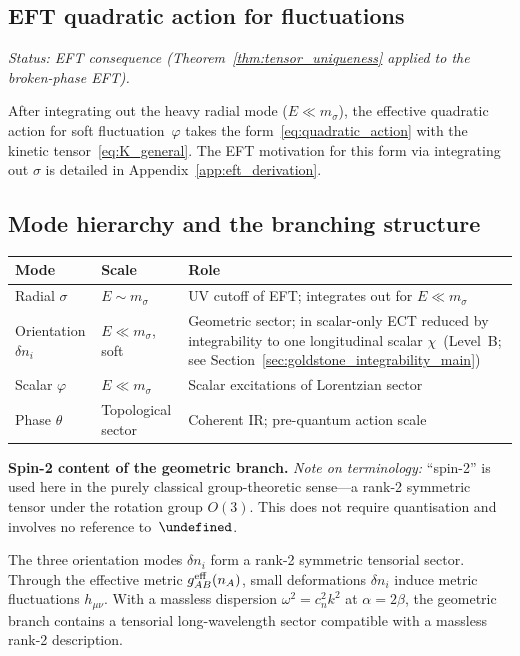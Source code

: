 \documentclass[11pt,a4paper]{article}
\let\hbar\undefined
\numberwithin{equation}{section}
\begin{document}
\subsection{EFT quadratic action for fluctuations}

\label{sec:eft_quadratic}

\textit{Status: EFT consequence (Theorem~\ref{thm:tensor_uniqueness}
applied to the broken-phase EFT).}

After integrating out the heavy radial mode ($E\ll m_\sigma$),
the effective quadratic action for soft fluctuation~$\varphi$
takes the form~\eqref{eq:quadratic_action} with the kinetic
tensor~\eqref{eq:K_general}. The EFT motivation for this form
via integrating out $\sigma$ is detailed in
Appendix~\ref{app:eft_derivation}.

\subsection{Mode hierarchy and the branching structure}
\label{sec:mode_hierarchy}

\begin{center}
\renewcommand{\arraystretch}{1.4}
\begin{tabular}{p{3cm}p{3.5cm}p{5cm}}
\hline\hline
Mode & Scale & Role \\
\hline
Radial $\sigma$ & $E\sim m_\sigma$ & UV cutoff of EFT; integrates out for $E\ll m_\sigma$ \\
Orientation $\delta n_i$ & $E\ll m_\sigma$, soft & Geometric sector; in scalar-only ECT reduced by
integrability to one longitudinal scalar $\chi$~(Level~B; see
Section~\ref{sec:goldstone_integrability_main}) \\
Scalar $\varphi$ & $E\ll m_\sigma$ & Scalar excitations of Lorentzian sector \\
Phase $\theta$ & Topological sector & Coherent IR; pre-quantum action scale \\
\hline\hline
\end{tabular}
\end{center}

\noindent\textbf{Spin-2 content of the geometric branch.}
\textit{Note on terminology:} ``spin-2'' is used here in the purely
classical group-theoretic sense---a rank-2 symmetric tensor under
the rotation group $O(3)$. This does not require quantisation and
involves no reference to~$\hbar$.

The three orientation modes $\delta n_i$ form a rank-2 symmetric tensorial
sector. Through the effective metric $g^{\rm eff}_{AB}(n_A)$,
small deformations $\delta n_i$ induce metric fluctuations $h_{\mu\nu}$.
With a massless dispersion $\omega^2=c_n^2 k^2$ at $\alpha=2\beta$,
the geometric branch contains a tensorial long-wavelength sector
compatible with a massless rank-2 description.
\end{document}
